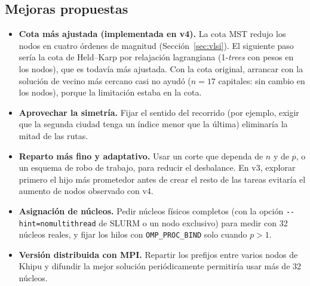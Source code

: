 \documentclass[12pt,a4paper]{article}
\begin{document}
\subsection{Mejoras propuestas}
\begin{itemize}
    \item \textbf{Cota más ajustada (implementada en v4).} La cota MST redujo los nodos en cuatro órdenes de magnitud (Sección~\ref{sec:vlsi}). El siguiente paso sería la cota de Held--Karp por relajación lagrangiana (1-\textit{trees} con pesos en los nodos), que es todavía más ajustada. Con la cota original, arrancar con la solución de vecino más cercano casi no ayudó ($n=17$ capitales: sin cambio en los nodos), porque la limitación estaba en la cota.
    \item \textbf{Aprovechar la simetría.} Fijar el sentido del recorrido (por ejemplo, exigir que la segunda ciudad tenga un índice menor que la última) eliminaría la mitad de las rutas.
    \item \textbf{Reparto más fino y adaptativo.} Usar un corte que dependa de $n$ y de $p$, o un esquema de robo de trabajo, para reducir el desbalance. En v3, explorar primero el hijo más prometedor antes de crear el resto de las tareas evitaría el aumento de nodos observado con v4.
    \item \textbf{Asignación de núcleos.} Pedir núcleos físicos completos (con la opción \texttt{-{}-hint=}\allowbreak\texttt{nomultithread} de SLURM o un nodo exclusivo) para medir con 32 núcleos reales, y fijar los hilos con \texttt{OMP\_PROC\_BIND} solo cuando $p > 1$.
    \item \textbf{Versión distribuida con MPI.} Repartir los prefijos entre varios nodos de Khipu y difundir la mejor solución periódicamente permitiría usar más de 32 núcleos.
\end{itemize}
\end{document}
